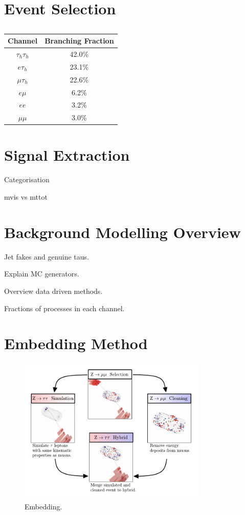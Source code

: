 \section{Event Selection}

\begin{table}[h]
    \centering
    \begin{tabular}{|c|c|}
         \hline
         Channel & Branching Fraction  \\
         \hline
         \hline
         $\tau_h \tau_h$ & 42.0\% \\
         $e \tau_h$ & 23.1\% \\
         $\mu \tau_h$ & 22.6\% \\
         $e \mu$ & 6.2\% \\
         $e e$ & 3.2\% \\
         $\mu \mu$ & 3.0\% \\
         \hline
    \end{tabular}
    \caption{}
\end{table}

\section{Signal Extraction}

Categorisation

mvis vs mttot

\section{Background Modelling Overview}

Jet fakes and genuine taus.

Explain MC generators.

Overview data driven methods.

Fractions of processes in each channel.

\section{Embedding Method}

\begin{figure}[!hbtp]
\centering
    \includegraphics[width=0.8\textwidth]{Figures/Embedding_Diagram.pdf}
\caption{Embedding.}
\label{fig:embedding}
\end{figure}

